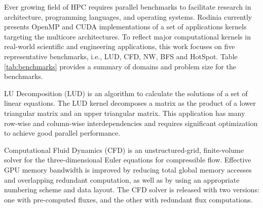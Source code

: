 
Ever growing field of HPC requires parallel benchmarks to facilitate research in architecture, programming languages, and operating systems. Rodinia currently presents OpenMP and CUDA implementations of a set of applications kernels targeting the multicore architectures. To reflect major computational kernels in real-world scientific and engineering applications, this work focuses on five representative benchmarks, i.e., LUD, CFD, NW, BFS and HotSpot. Table \ref{tab:benchmarks} provides a summary of domains and problem size for the benchmarks. 


LU Decomposition (LUD) is an algorithm to calculate the solutions of a set of linear equations. The LUD kernel decomposes a matrix as the product of a lower triangular matrix and an upper triangular matrix. This application has many row-wise and column-wise interdependencies and requires significant optimization to achieve good parallel performance.



Computational Fluid Dynamics (CFD) is an unstructured-grid, finite-volume solver for the three-dimensional Euler equations for compressible flow. Effective GPU memory bandwidth is improved by reducing total global memory accesses and overlapping redundant computation, as well as by using an appropriate numbering scheme and data layout. The CFD solver is released with two versions: one with pre-computed fluxes, and the other with redundant flux computations.


